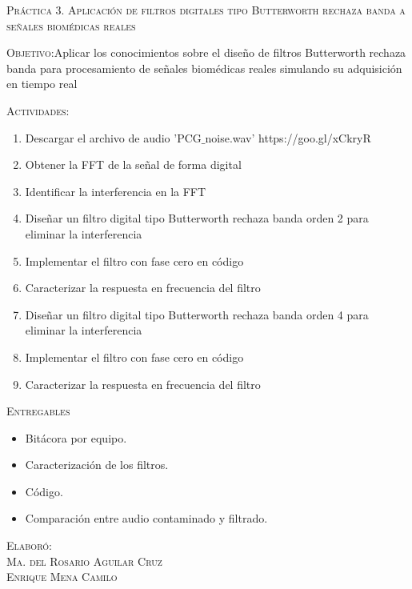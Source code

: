 \documentclass[10pt,letterpaper,spanish,twoside]{report}
\begin{document}
\docdate

\begin{center}
 \textsc{\asignatura}\vspace{.2em}
\end{center}

\textsc{Práctica 3. Aplicación de filtros digitales tipo Butterworth rechaza banda a señales biomédicas reales}

\textsc{Objetivo:}Aplicar los conocimientos sobre el diseño de filtros Butterworth rechaza banda para procesamiento de señales biomédicas reales simulando su adquisición en tiempo real

\textsc{Actividades:}
\begin{enumerate}
  \item Descargar el archivo de audio 'PCG$\_$noise.wav' https://goo.gl/xCkryR
  \item Obtener la FFT de la señal de forma digital
  \item Identificar la interferencia en la FFT
  \item Diseñar un filtro digital tipo Butterworth rechaza banda orden 2 para eliminar la interferencia
  \item Implementar el filtro con fase cero en código
  \item Caracterizar la respuesta en frecuencia del filtro
  \item Diseñar un filtro digital tipo Butterworth rechaza banda orden 4 para eliminar la interferencia
  \item Implementar el filtro con fase cero en código
  \item Caracterizar la respuesta en frecuencia del filtro
\end{enumerate}

\textsc{Entregables}
\begin{itemize}
  \item Bitácora por equipo.
  \item Caracterización de los filtros.
  \item Código.
  \item Comparación entre audio contaminado y filtrado.
\end{itemize}


\vfill
\begin{flushright}
\textsc{Elaboró:\\
Ma. del Rosario Aguilar Cruz\\
Enrique Mena Camilo}
\end{flushright}
\end{document}
